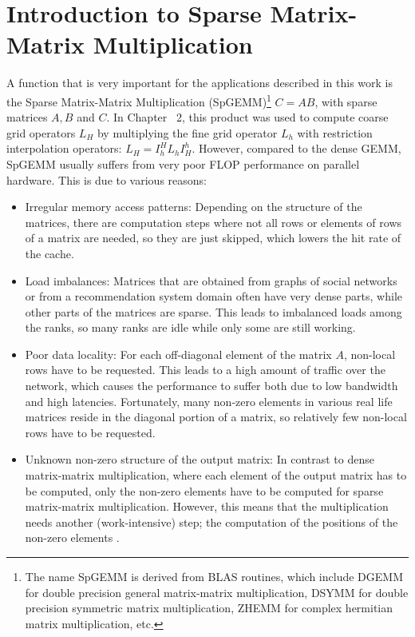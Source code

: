 \section{Introduction to Sparse Matrix-Matrix Multiplication}
A function that is very important for the applications described in this work is the Sparse Matrix-Matrix Multiplication (SpGEMM)\footnote{The name SpGEMM is derived from BLAS routines, which include DGEMM for double precision general matrix-matrix multiplication, DSYMM for double precision symmetric matrix multiplication, ZHEMM for complex hermitian matrix multiplication, etc.} $C = A B$, with sparse matrices $A, B$ and $C$. In Chapter ~2, this product was used to compute coarse grid operators $L_H$ by multiplying the fine grid operator $L_h$ with restriction interpolation operators: $L_H = I_h^HL_h I_H^h$.
However, compared to the dense GEMM, SpGEMM usually suffers from very poor FLOP performance on parallel hardware. This is due to various reasons:  
\begin{itemize}
\item Irregular memory access patterns: Depending on the structure of the matrices, there are computation steps where not all rows or elements of rows of a matrix are needed, so they are just skipped, which lowers the hit rate of the cache.
\item Load imbalances: Matrices that are obtained from graphs of social networks or from a recommendation system domain often have very dense parts, while other parts of the matrices are sparse. This leads to imbalanced loads among the ranks, so many ranks are idle while only some are still working.
\item Poor data locality: For each off-diagonal element of the matrix $A$, non-local rows have to be requested. This leads to a high amount of traffic over the network, which causes the performance to suffer both due to low bandwidth and high latencies. Fortunately, many non-zero elements in various real life matrices reside in the diagonal portion of a matrix, so relatively few non-local rows have to be requested.  
\item Unknown non-zero structure of the output matrix: In contrast to dense matrix-matrix multiplication, where each element of the output matrix has to be computed, only the non-zero elements have to be computed  for sparse matrix-matrix multiplication. However, this means that the multiplication needs another (work-intensive) step; the computation of the positions of the non-zero elements \cite{intel_algorithm}.
\end{itemize}

